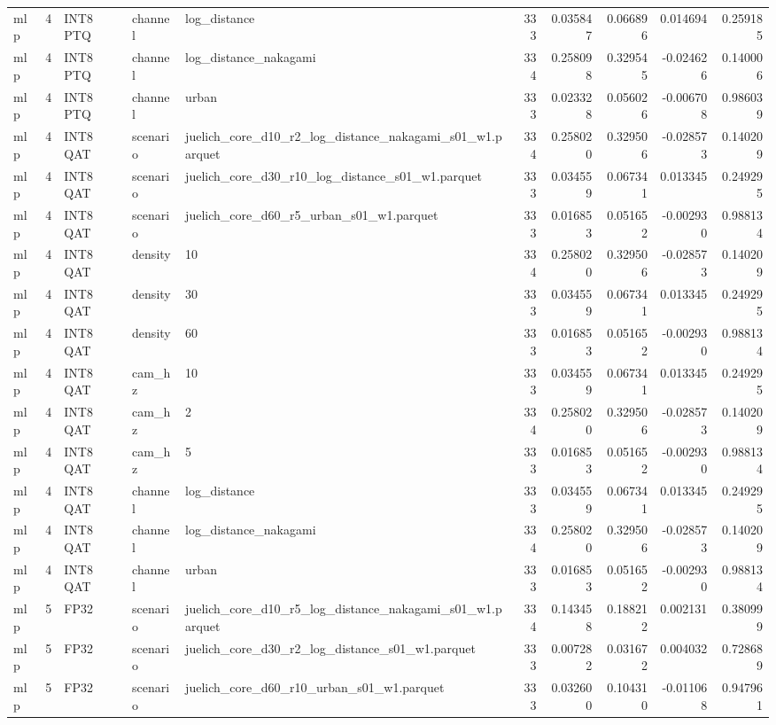 \begin{tabular}{lrlllrrrrr}
mlp & 4 & INT8 PTQ & channel & log\_distance & 333 & 0.035847 & 0.066896 & 0.014694 & 0.259185 \\
mlp & 4 & INT8 PTQ & channel & log\_distance\_nakagami & 334 & 0.258098 & 0.329545 & -0.024626 & 0.140006 \\
mlp & 4 & INT8 PTQ & channel & urban & 333 & 0.023328 & 0.056026 & -0.006708 & 0.986039 \\
mlp & 4 & INT8 QAT & scenario & juelich\_core\_d10\_r2\_log\_distance\_nakagami\_s01\_w1.parquet & 334 & 0.258020 & 0.329506 & -0.028573 & 0.140209 \\
mlp & 4 & INT8 QAT & scenario & juelich\_core\_d30\_r10\_log\_distance\_s01\_w1.parquet & 333 & 0.034559 & 0.067341 & 0.013345 & 0.249295 \\
mlp & 4 & INT8 QAT & scenario & juelich\_core\_d60\_r5\_urban\_s01\_w1.parquet & 333 & 0.016853 & 0.051652 & -0.002930 & 0.988134 \\
mlp & 4 & INT8 QAT & density & 10 & 334 & 0.258020 & 0.329506 & -0.028573 & 0.140209 \\
mlp & 4 & INT8 QAT & density & 30 & 333 & 0.034559 & 0.067341 & 0.013345 & 0.249295 \\
mlp & 4 & INT8 QAT & density & 60 & 333 & 0.016853 & 0.051652 & -0.002930 & 0.988134 \\
mlp & 4 & INT8 QAT & cam\_hz & 10 & 333 & 0.034559 & 0.067341 & 0.013345 & 0.249295 \\
mlp & 4 & INT8 QAT & cam\_hz & 2 & 334 & 0.258020 & 0.329506 & -0.028573 & 0.140209 \\
mlp & 4 & INT8 QAT & cam\_hz & 5 & 333 & 0.016853 & 0.051652 & -0.002930 & 0.988134 \\
mlp & 4 & INT8 QAT & channel & log\_distance & 333 & 0.034559 & 0.067341 & 0.013345 & 0.249295 \\
mlp & 4 & INT8 QAT & channel & log\_distance\_nakagami & 334 & 0.258020 & 0.329506 & -0.028573 & 0.140209 \\
mlp & 4 & INT8 QAT & channel & urban & 333 & 0.016853 & 0.051652 & -0.002930 & 0.988134 \\
mlp & 5 & FP32 & scenario & juelich\_core\_d10\_r5\_log\_distance\_nakagami\_s01\_w1.parquet & 334 & 0.143458 & 0.188212 & 0.002131 & 0.380999 \\
mlp & 5 & FP32 & scenario & juelich\_core\_d30\_r2\_log\_distance\_s01\_w1.parquet & 333 & 0.007282 & 0.031672 & 0.004032 & 0.728689 \\
mlp & 5 & FP32 & scenario & juelich\_core\_d60\_r10\_urban\_s01\_w1.parquet & 333 & 0.032600 & 0.104310 & -0.011068 & 0.947961 \\

\end{tabular}
